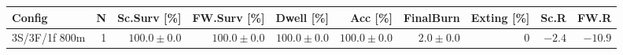 \begin{tabular}{l r r r r r r r r r}
\toprule
Config & N & Sc.Surv [\%] & FW.Surv [\%] & Dwell [\%] & Acc [\%] & FinalBurn & Exting [\%] & Sc.R & FW.R \\
\midrule
3S/3F/1f 800m & 1 & $100.0 \pm 0.0$ & $100.0 \pm 0.0$ & $100.0 \pm 0.0$ & $100.0 \pm 0.0$ & $2.0 \pm 0.0$ & $0$ & $-2.4$ & $-10.9$ \\
\bottomrule
\end{tabular}